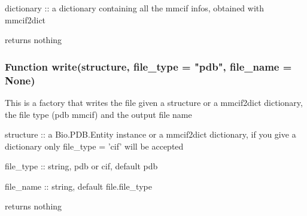         dictionary :: a dictionary containing all the mmcif infos, obtained with mmcif2dict

        returns nothing

    \subsubsection{Function write(structure, file\_type = "pdb", file\_name = None)}
        This is a factory that writes the file given a structure or a mmcif2dict dictionary, the file type (pdb mmcif) and the output file name
        
        structure :: a Bio.PDB.Entity instance or a mmcif2dict dictionary, if you give a dictionary only file\_type = 'cif' will be accepted
    
        file\_type :: string, pdb or cif, default pdb
    
        file\_name :: string, default file.{file\_type}

        returns nothing
    